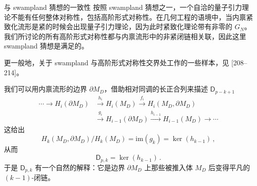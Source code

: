 \begin{notebox}{与 swampland 猜想的一致性}
按照 swampland 猜想之一，一个自洽的量子引力理论不能有任何整体对称性，包括高阶形式对称性。在几何工程的语境中，当内禀紧致化流形是紧的时候会出现量子引力理论，因为此时紧致化理论带有非零的 $G_N$。我们所讨论的所有高阶形式对称性都与内禀流形中的非紧闭链相关联，因此这里 swampland 猜想是满足的。

更一般地，关于 swampland 与高阶形式对称性交界处工作的一些样本，见 [208--214]。
\end{notebox}

我们可以用内禀流形的边界 $\partial M_D$，借助相对同调的长正合列来描述 $\mathsf{D}_{p-k+1}$
\begin{equation}
\begin{aligned}
\cdots \to H_i(\partial M_D) &\xrightarrow{h_i} H_i(M_D) \xrightarrow{f_i} H_i(M_D,\partial M_D)\\
&\xrightarrow{g_i} H_{i-1}(\partial M_D) \xrightarrow{h_{i-1}} H_{i-1}(M_D) \to \cdots
\end{aligned}\tag{6.12}
\end{equation}
这给出
\begin{equation}
  H_k(M_D,\partial M_D)/H_k(M_D) = \mathrm{im}(g_k) = \ker(h_{k-1})\,, \tag{6.13}
\end{equation}
从而
\begin{equation}
  \mathsf{D}_{p,k} = \ker(h_{k-1})\,. \tag{6.14}
\end{equation}
于是 $\mathsf{D}_{p,k}$ 有一个自然的解释：它是边界 $\partial M_D$ 上那些被推入体 $M_D$ 后变得平凡的 $(k-1)$-闭链。


